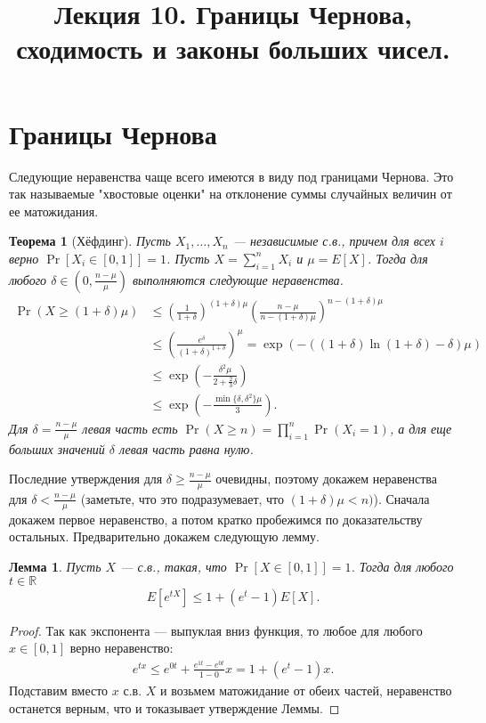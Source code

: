 \documentclass[12pt]{article}
\title{Лекция 10. Границы Чернова, сходимость и законы больших чисел.}
\newcommand\R{\mathbb{R}}
\newtheorem{theorem}{Теорема}
\newtheorem{lemma}{Лемма}
\begin{document}
\maketitle

\section{Границы Чернова}



Следующие неравенства чаще всего имеются в виду под границами Чернова. Это так называемые "хвостовые оценки" на отклонение суммы случайных величин от ее матожидания.

\begin{theorem}[Хёфдинг]
  \label{thm:chernoff-upper}
 Пусть $X_1, \dots, X_n$ --- независимые с.в., причем для всех $i$ верно $\Pr[X_i \in [0, 1]] = 1$. Пусть $X = \sum_{i = 1}^n X_i$ и $\mu = E[X]$. Тогда для любого $\delta \in (0, \frac{n - \mu}{\mu})$ выполняются следующие неравенства.
  \begin{align*}
    \Pr(X \ge (1 + \delta)\mu) &\le \left(\frac{1}{1 + \delta}\right)^{(1 + \delta)\mu} \left(\frac{n - \mu}{n - (1 + \delta)\mu}\right)^{n - (1 + \delta)\mu} \\
    &\le \left(\frac{e^\delta}{(1 + \delta)^{1 +\delta}}\right)^{\mu} = \exp\left(-((1 + \delta)\ln(1 + \delta) - \delta)\mu\right)\\
    &\le \exp\left(-\frac{\delta^2 \mu}{2 + \frac{2}{3}\delta}\right)\\
    &\le \exp\left(-\frac{\min\{\delta, \delta^2\}\mu}{3}\right).
  \end{align*}  
  Для $\delta = \frac{n - \mu}{\mu}$ левая часть есть $\Pr(X \ge n) = \prod_{i = 1}^n \Pr(X_i = 1)$, а для еще больших значений $\delta$ левая часть равна нулю. 
\end{theorem}

Последние утверждения для $\delta \ge \frac{n - \mu}{\mu}$ очевидны, поэтому докажем неравенства для $\delta < \frac{n - \mu}{\mu}$ (заметьте, что это подразумевает, что $(1 + \delta)\mu < n)$). Сначала докажем первое неравенство, а потом кратко пробежимся по доказательству остальных. Предварительно докажем следующую лемму.

\begin{lemma}
  \label{lem:convex-exp}
  Пусть $X$ --- с.в., такая, что $\Pr[X \in [0, 1]] = 1$. Тогда для любого $t \in \R$
  \begin{align*}
    E[e^{tX}] \le 1 + (e^t - 1)E[X].
  \end{align*}
\end{lemma}
\begin{proof}
  Так как экспонента --- выпуклая вниз функция, то любое для любого $x \in [0, 1]$ верно неравенство:
  \begin{align*}
    e^{tx} \le e^{0t} + \frac{e^{1t} - e^{0t}}{1 - 0} x = 1 + (e^t - 1)x.
  \end{align*} 
  Подставим вместо $x$ с.в. $X$ и возьмем матожидание от обеих частей, неравенство останется верным, что и токазывает утверждение Леммы.
\end{proof}
\end{document}
